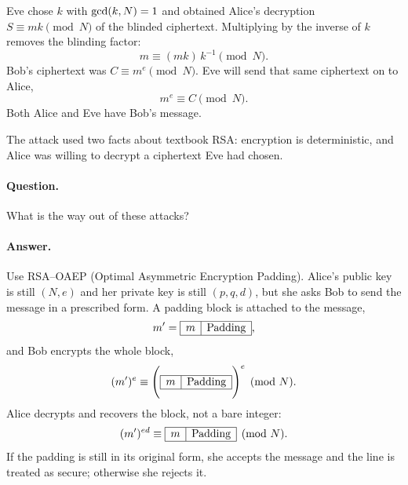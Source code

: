 
Eve chose $k$ with $\operatorname{gcd}(k,N)=1$ and obtained Alice's decryption
$S\equiv mk\pmod{N}$ of the blinded ciphertext. Multiplying by the
inverse of $k$ removes the blinding factor:
\[
    m\equiv (mk)\,k^{-1}\pmod{N}.
\]
Bob's ciphertext was $C\equiv m^{e}\pmod{N}$. Eve will send that same
ciphertext on to Alice,
\[
    m^{e}\equiv C\pmod{N}.
\]
Both Alice and Eve have Bob's message.

The attack used two facts about textbook RSA: encryption is deterministic,
and Alice was willing to decrypt a ciphertext Eve had chosen.

\paragraph{Question.}
What is the way out of these attacks?

\paragraph{Answer.}
Use RSA--OAEP (Optimal Asymmetric Encryption Padding). Alice's public key
is still $(N,e)$ and her private key is still $(p,q,d)$, but she asks Bob
to send the message in a prescribed form. A padding block is attached to
the message,
\[
    m'
    =
    \begin{array}{|c|c|}
        \hline
        m & \text{Padding}\\
        \hline
    \end{array},
\]
and Bob encrypts the whole block,
\[
    (m')^{e}
    \equiv
    \Biggl(
        \begin{array}{|c|c|}
            \hline
            m & \text{Padding}\\
            \hline
        \end{array}
    \Biggr)^{e}
    \pmod{N}.
\]
Alice decrypts and recovers the block, not a bare integer:
\[
    (m')^{ed}
    \equiv
    \begin{array}{|c|c|}
        \hline
        m & \text{Padding}\\
        \hline
    \end{array}
    \pmod{N}.
\]
If the padding is still in its original form, she accepts the message and
the line is treated as secure; otherwise she rejects it.

